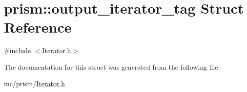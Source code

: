 \hypertarget{structprism_1_1output__iterator__tag}{}\section{prism\+:\+:output\+\_\+iterator\+\_\+tag Struct Reference}
\label{structprism_1_1output__iterator__tag}


{\ttfamily \#include $<$Iterator.\+h$>$}



The documentation for this struct was generated from the following file\+:\begin{DoxyCompactItemize}
\item 
inc/prism/\hyperlink{_iterator_8h}{Iterator.\+h}\end{DoxyCompactItemize}

